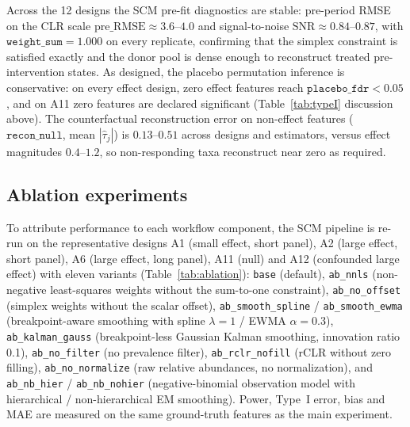 \documentclass[11pt]{article}
\begin{document}
Across the 12 designs the SCM pre-fit diagnostics are stable: pre-period RMSE on the CLR scale
$\mathrm{pre\_RMSE} \approx 3.6$--$4.0$ and signal-to-noise $\mathrm{SNR} \approx 0.84$--$0.87$,
with $\texttt{weight\_sum}=1.000$ on every replicate, confirming that the simplex constraint is
satisfied exactly and the donor pool is dense enough to reconstruct treated pre-intervention states.
As designed, the placebo permutation inference is conservative: on every effect design, zero effect
features reach $\texttt{placebo\_fdr}<0.05$, and on A11 zero features are declared significant
(Table~\ref{tab:typeI} discussion above). The counterfactual reconstruction error on non-effect
features ($\texttt{recon\_null}$, mean $|\hat\tau_j|$) is $0.13$--$0.51$ across designs and
estimators, versus effect magnitudes $0.4$--$1.2$, so non-responding taxa reconstruct near zero as required.



\subsection{Ablation experiments} \label{sec:ablation}

To attribute performance to each workflow component, the SCM pipeline is re-run on the
representative designs A1 (small effect, short panel), A2 (large effect, short panel), A6 (large
effect, long panel), A11 (null) and A12 (confounded large effect) with eleven variants
(Table~\ref{tab:ablation}): \texttt{base} (default), \texttt{ab\_nnls} (non-negative least-squares
weights without the sum-to-one constraint), \texttt{ab\_no\_offset} (simplex weights without the
scalar offset), \texttt{ab\_smooth\_spline} / \texttt{ab\_smooth\_ewma} (breakpoint-aware smoothing
with spline $\lambda{=}1$ / EWMA $\alpha{=}0.3$), \texttt{ab\_kalman\_gauss} (breakpoint-less
Gaussian Kalman smoothing, innovation ratio 0.1), \texttt{ab\_no\_filter} (no prevalence filter),
\texttt{ab\_rclr\_nofill} (rCLR without zero filling), \texttt{ab\_no\_normalize} (raw relative
abundances, no normalization), and \texttt{ab\_nb\_hier} / \texttt{ab\_nb\_nohier} (negative-binomial
observation model with hierarchical / non-hierarchical EM smoothing). Power, Type~I error, bias and
MAE are measured on the same ground-truth features as the main experiment.
\end{document}
